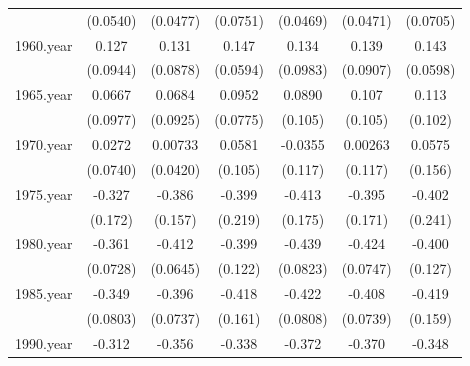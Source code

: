 {\begin{tabular}{l*{6}{c}}
            &    (0.0540)         &    (0.0477)         &    (0.0751)         &    (0.0469)         &    (0.0471)         &    (0.0705)         \\
[1em]
1960.year   &       0.127         &       0.131         &       0.147\sym{*}  &       0.134         &       0.139         &       0.143\sym{*}  \\
            &    (0.0944)         &    (0.0878)         &    (0.0594)         &    (0.0983)         &    (0.0907)         &    (0.0598)         \\
[1em]
1965.year   &      0.0667         &      0.0684         &      0.0952         &      0.0890         &       0.107         &       0.113         \\
            &    (0.0977)         &    (0.0925)         &    (0.0775)         &     (0.105)         &     (0.105)         &     (0.102)         \\
[1em]
1970.year   &      0.0272         &     0.00733         &      0.0581         &     -0.0355         &     0.00263         &      0.0575         \\
            &    (0.0740)         &    (0.0420)         &     (0.105)         &     (0.117)         &     (0.117)         &     (0.156)         \\
[1em]
1975.year   &      -0.327         &      -0.386\sym{*}  &      -0.399         &      -0.413\sym{*}  &      -0.395\sym{*}  &      -0.402         \\
            &     (0.172)         &     (0.157)         &     (0.219)         &     (0.175)         &     (0.171)         &     (0.241)         \\
[1em]
1980.year   &      -0.361\sym{***}&      -0.412\sym{***}&      -0.399\sym{**} &      -0.439\sym{***}&      -0.424\sym{***}&      -0.400\sym{**} \\
            &    (0.0728)         &    (0.0645)         &     (0.122)         &    (0.0823)         &    (0.0747)         &     (0.127)         \\
[1em]
1985.year   &      -0.349\sym{***}&      -0.396\sym{***}&      -0.418\sym{**} &      -0.422\sym{***}&      -0.408\sym{***}&      -0.419\sym{**} \\
            &    (0.0803)         &    (0.0737)         &     (0.161)         &    (0.0808)         &    (0.0739)         &     (0.159)         \\
[1em]
1990.year   &      -0.312\sym{**} &      -0.356\sym{**} &      -0.338\sym{*}  &      -0.372\sym{***}&      -0.370\sym{***}&      -0.348\sym{*}  \\

\end{tabular}}
